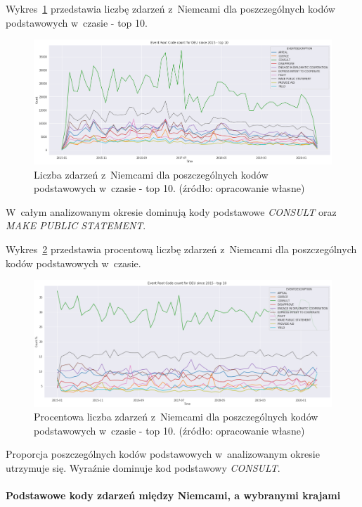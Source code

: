 \documentclass[11pt]{report}
\begin{document}
    Wykres~\ref{fig:DEUPERCinTIME} przedstawia liczbę zdarzeń z~Niemcami dla poszczególnych kodów podstawowych w~czasie - top 10.
    \begin{figure}[!htp]
        \centering
        \includegraphics[width=\linewidth]{fig/DEU/DEUERCinTIME.png}
        \caption{Liczba zdarzeń z~Niemcami dla poszczególnych kodów podstawowych w~czasie - top 10. (źródło: opracowanie własne)}
        \label{fig:DEUPERCinTIME}
    \end{figure}
    W~całym analizowanym okresie dominują kody podstawowe \textit{CONSULT} oraz \textit{MAKE PUBLIC STATEMENT}.

    Wykres~\ref{fig:DEUPERCpercinTIME} przedstawia procentową liczbę zdarzeń z~Niemcami dla poszczególnych kodów podstawowych w~czasie.
    \begin{figure}[!htp]
        \centering
        \includegraphics[width=\linewidth]{fig/DEU/DEUERCpercinTIME.png}
        \caption{Procentowa liczba zdarzeń z~Niemcami dla poszczególnych kodów podstawowych w~czasie - top 10. (źródło: opracowanie własne)}
        \label{fig:DEUPERCpercinTIME}
    \end{figure}
    Proporcja poszczególnych kodów podstawowych w~analizowanym okresie utrzymuje się.
    Wyraźnie dominuje kod podstawowy \textit{CONSULT}.

    \paragraph{Podstawowe kody zdarzeń między Niemcami, a wybranymi krajami}
\end{document}
